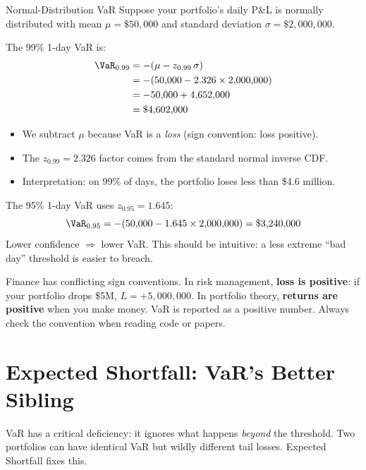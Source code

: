 \begin{workedexample}{Normal-Distribution VaR}
Suppose your portfolio's daily P\&L is normally distributed with mean
$\mu = \$50{,}000$ and standard deviation $\sigma = \$2{,}000{,}000$.

The 99\% 1-day VaR is:
\begin{align}
\VaR_{0.99} &= -({\mu - z_{0.99}\,\sigma}) \notag \\
            &= -(50{,}000 - 2.326 \times 2{,}000{,}000) \notag \\
            &= -50{,}000 + 4{,}652{,}000 \notag \\
            &= \$4{,}602{,}000
\end{align}
\begin{itemize}[nosep]
  \item We subtract $\mu$ because VaR is a \emph{loss} (sign convention:
        loss positive).
  \item The $z_{0.99}=2.326$ factor comes from the standard normal
        inverse CDF.
  \item Interpretation: on 99\% of days, the portfolio loses less than
        \$4.6 million.
\end{itemize}

The 95\% 1-day VaR uses $z_{0.95}=1.645$:
\[
  \VaR_{0.95} = -(50{,}000 - 1.645 \times 2{,}000{,}000) = \$3{,}240{,}000
\]
Lower confidence $\Rightarrow$ lower VaR.  This should be intuitive: a
less extreme ``bad day'' threshold is easier to breach.
\end{workedexample}

\begin{prereq}
Finance has conflicting sign conventions.  In risk management, \textbf{loss
is positive}: if your portfolio drops \$5M, $L = +5{,}000{,}000$.
In portfolio theory, \textbf{returns are positive} when you make money.
VaR is reported as a positive number.  Always check the convention when
reading code or papers.
\end{prereq}


\section{Expected Shortfall: VaR's Better Sibling}
\label{sec:expected-shortfall}

VaR has a critical deficiency: it ignores what happens \emph{beyond} the
threshold.  Two portfolios can have identical VaR but wildly different tail
losses.  Expected Shortfall fixes this.

